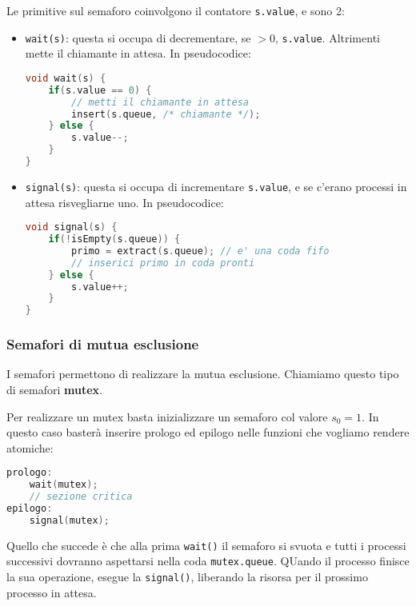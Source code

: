 \documentclass[a4paper,11pt]{article}
\begin{document}
Le primitive sul semaforo coinvolgono il contatore \lstinline|s.value|, e sono 2:
\begin{itemize}
	\item \lstinline|wait(s)|: questa si occupa di decrementare, se $> 0$, \lstinline|s.value|. Altrimenti mette il chiamante in attesa. In pseudocodice:
\begin{lstlisting}[language=C++, style=codestyle]	
void wait(s) {
	if(s.value == 0) {
		// metti il chiamante in attesa
		insert(s.queue, /* chiamante */);	
	} else {
		s.value--;
	}
}
\end{lstlisting}
	
	\item \lstinline|signal(s)|: questa si occupa di incrementare \lstinline|s.value|, e se c'erano processi in attesa risvegliarne uno. In pseudocodice:
\begin{lstlisting}[language=C++, style=codestyle]	
void signal(s) {
	if(!isEmpty(s.queue)) {
		primo = extract(s.queue); // e' una coda fifo
		// inserici primo in coda pronti
	} else {
		s.value++;
	}
}
\end{lstlisting}
\end{itemize}

\subsubsection{Semafori di mutua esclusione}
I semafori permettono di realizzare la mutua esclusione. Chiamiamo questo tipo di semafori \textbf{mutex}.

Per realizzare un mutex basta inizializzare un semaforo col valore $s_0 = 1$.
In questo caso basterà inserire prologo ed epilogo nelle funzioni che vogliamo rendere atomiche:
\begin{lstlisting}[language=C++, style=codestyle]	
prologo:
	wait(mutex);
	// sezione critica
epilogo:
	signal(mutex);
\end{lstlisting}

Quello che succede è che alla prima \lstinline|wait()| il semaforo si svuota e tutti i processi successivi dovranno aspettarsi nella coda \lstinline|mutex.queue|.
QUando il processo finisce la sua operazione, esegue la \lstinline|signal()|, liberando la risorsa per il prossimo processo in attesa. 
\end{document}
